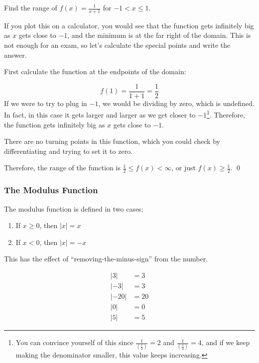 \begin{example}
    Find the range of $f(x) = \frac{1}{x+1}$ for $-1 < x \leq 1$.
\end{example}
\begin{solution}
    If you plot this on a calculator, you would see that the function gets infinitely big as $x$ gets close to $-1$, and the minimum is at the far right of the domain. This is not enough for an exam, so let's calculate the special points and write the answer.

    First calculate the function at the endpoints of the domain:

    \[f(1) = \frac{1}{1+1} = \frac{1}{2}\]
    If we were to try to plug in $-1$, we would be dividing by zero, which is undefined. In fact, in this case it gets larger and larger as we get closer to $-1$\footnote{You can convince yourself of this since $\frac{1}{\left(\frac{1}{2}\right)} = 2$ and  $\frac{1}{\left(\frac{1}{4}\right)} = 4$, and if we keep making the denominator smaller, this value keeps increasing.}.
    Therefore, the function gets infinitely big as $x$ gets close to $-1$.

    There are no turning points in this function, which you could check by differentiating and trying to set it to zero.

    Therefore, the range of the function is $\frac{1}{2} \leq f(x) < \infty$, or just $f(x) \geq \frac{1}{2}$.
    \qed
\end{solution}


\subsubsection{The Modulus Function}
The modulus function is defined in two cases:

\begin{enumerate}
    \item If $x\geq0$, then $| x |= x$
    \item If $x<0$, then $| x |= -x$
\end{enumerate}

This has the effect of ``removing-the-minus-sign'' from the number.

\begin{example}
    \begin{align*}
        |3| &= 3\\
        |-3| &= 3\\
        |-20| &= 20\\
        |0| &= 0\\
        |5| &= 5
    \end{align*}
\end{example}

